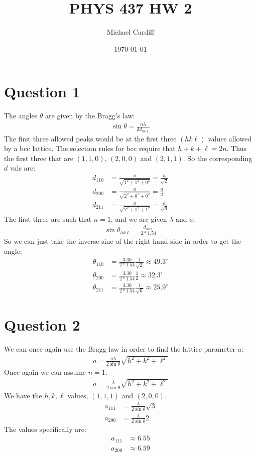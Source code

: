 \documentclass[12pt]{article}
\title{\vspace{-3em}PHYS 437 HW 2}
\author{Michael Cardiff}
\date{\today}
\begin{document}
\maketitle
\section*{Question 1}
The angles $\theta$ are given by the Bragg's law:
\begin{align*}
  \sin\theta=\frac{n\lambda}{2d_{hk\ell}}
\end{align*}
The first three allowed peaks would be at the first three $(hk\ell)$ values allowed by a bcc lattice. The selection rules for bcc require that $h+k+\ell=2n$. Thus the first three that are $(1,1,0)$, $(2,0,0)$ and $(2,1,1)$. So the corresponding $d$ vals are:
\begin{align*}
  d_{110}&=\frac{a}{\sqrt{1^2+1^2+0^2}}=\frac{a}{\sqrt{2}}\\
  d_{200}&=\frac{a}{\sqrt{2^2+0^2+0^2}}=\frac{a}{2}\\
  d_{211}&=\frac{a}{\sqrt{2^2+1^2+1^2}}=\frac{a}{\sqrt{6}}
\end{align*}
The first three are such that $n=1$, and we are given $\lambda$ and $a$:
\begin{align*}
  \sin\theta_{hk\ell}=\frac{d_{hk\ell}}{2*1.54}
\end{align*}
So we can just take the inverse sine of the right hand side in order to get the angle:
\begin{align*}
  \theta_{110}&=\frac{3.30}{2*1.54}\frac{1}{\sqrt{2}}\approx\boxed{49.3^\circ}\\
  \theta_{200}&=\frac{3.30}{2*1.54}\frac{1}{2}\approx\boxed{32.3^\circ}\\
  \theta_{211}&=\frac{3.30}{2*1.54}\frac{1}{\sqrt{6}}\approx\boxed{25.9^\circ}
\end{align*}
\section*{Question 2}
We can once again use the Bragg law in order to find the lattice parameter $a$:
\begin{align*}
  a=\frac{n\lambda}{2\sin\theta}\sqrt{h^2+k^2+\ell^2}
\end{align*}
Once again we can assume $n=1$:
\begin{align*}
  a=\frac{\lambda}{2\sin\theta}\sqrt{h^2+k^2+\ell^2}
\end{align*}
We have the $h,k,\ell$ values, $(1,1,1)$ and $(2,0,0)$.
\begin{align*}
  a_{111}&=\frac{\lambda}{2\sin\theta}\sqrt{3}\\
  a_{200}&=\frac{\lambda}{2\sin\theta}2
\end{align*}
The values specifically are:
\begin{align*}
  a_{111}&\approx\boxed{6.55}\\
  a_{200}&\approx\boxed{6.59}
\end{align*}
\end{document}
